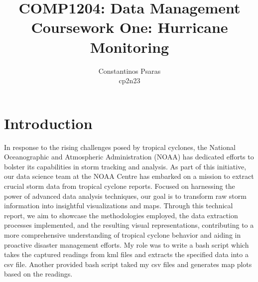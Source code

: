 \documentclass[]{article}
\title{\Huge COMP1204: Data Management \\ Coursework One: Hurricane Monitoring }
\author{\Large Constantinos Psaras \\ cp2n23}
\begin{document}

\vfill
\maketitle
\thispagestyle{empty}
\restoregeometry

\newpage
\thispagestyle{empty}
\tableofcontents
\newpage

\setcounter{page}{1}

\section{Introduction}
In response to the rising challenges posed by tropical cyclones, 
the National Oceanographic and Atmospheric Administration (NOAA) has dedicated efforts to bolster its capabilities in storm tracking and analysis.
As part of this initiative, our data science team at the NOAA Centre has embarked on a mission to extract crucial storm data from tropical cyclone reports. 
Focused on harnessing the power of advanced data analysis techniques, our goal is to transform raw storm information into insightful visualizations and maps. 
Through this technical report, we aim to showcase the methodologies employed, the data extraction processes implemented, and the resulting visual representations, 
contributing to a more comprehensive understanding of tropical cyclone behavior and aiding in proactive disaster management efforts. 
My role was to write a bash script which takes the captured readings from kml files and extracts the specified data into a csv file.
Another provided bash script taked my csv files and generates map plots based on the readings.
\newpage
\end{document}
